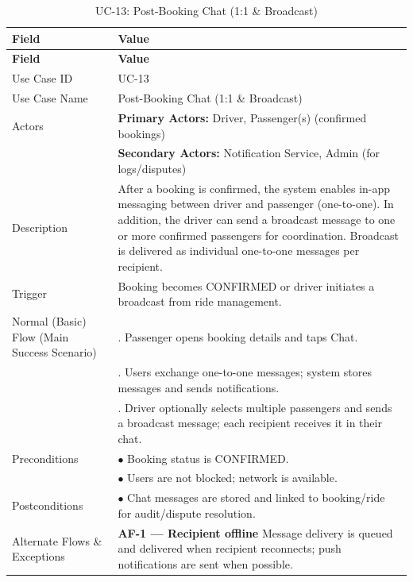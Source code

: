 \begin{longtable}{|>{\raggedright\arraybackslash}p{4cm}|>{\raggedright\arraybackslash}p{11cm}|}
\caption{UC-13: Post-Booking Chat (1:1 \& Broadcast)}
\label{tab:uc-13} \\
\hline
\rowcolor{lightgray!30}
\textbf{Field} & \textbf{Value} \\
\hline
\endfirsthead
\hline
\rowcolor{lightgray!30}
\textbf{Field} & \textbf{Value} \\
\hline
\endhead
\hline
\endfoot
\hline
\endlastfoot
Use Case ID & UC-13 \\
\hline
Use Case Name & Post-Booking Chat (1:1 \& Broadcast) \\
\hline
Actors & \textbf{Primary Actors:} Driver, Passenger(s) (confirmed bookings) \\
& \textbf{Secondary Actors:} Notification Service, Admin (for logs/disputes) \\
\hline
Description & After a booking is confirmed, the system enables in-app messaging between driver and passenger (one-to-one). In addition, the driver can send a broadcast message to one or more confirmed passengers for coordination. Broadcast is delivered as individual one-to-one messages per recipient. \\
\hline
Trigger & Booking becomes CONFIRMED or driver initiates a broadcast from ride management. \\
\hline
Normal (Basic) Flow (Main Success Scenario) & 1. Passenger opens booking details and taps Chat. \\
& 2. Users exchange one-to-one messages; system stores messages and sends notifications. \\
& 3. Driver optionally selects multiple passengers and sends a broadcast message; each recipient receives it in their chat. \\
\hline
Preconditions & $\bullet$ Booking status is CONFIRMED. \\
& $\bullet$ Users are not blocked; network is available. \\
\hline
Postconditions & $\bullet$ Chat messages are stored and linked to booking/ride for audit/dispute resolution. \\
\hline
Alternate Flows \& Exceptions & \textbf{AF-1 — Recipient offline} \newline Message delivery is queued and delivered when recipient reconnects; push notifications are sent when possible. \\

\end{longtable}
